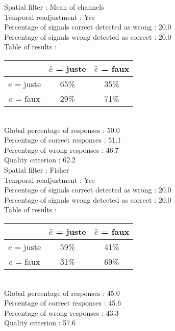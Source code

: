 Spatial filter : Mean of channels \\
Temporal readjustment : Yes \\
Percentage of signals correct detected as wrong :   20.0 \\
Percentage of signals wrong detected as correct :   20.0 \\
Table of results : \\
\begin{tabular}{|c|c|c|}
\hline				& $\hat{e}$ = juste & $\hat{e}$ = faux \\
\hline  $e$ = juste	&     65\%			&     35\%		\\
\hline  $e$ = faux	&     29\%			&     71\%		\\
\hline
\end{tabular}\\
Global percentage of responses :   50.0 \\
Percentage of correct responses :   51.1 \\
Percentage of wrong responses :   46.7 \\
Quality criterion :   62.2 \\

Spatial filter : Fisher \\
Temporal readjustment : Yes \\
Percentage of signals correct detected as wrong :   20.0 \\
Percentage of signals wrong detected as correct :   20.0 \\
Table of results : \\
\begin{tabular}{|c|c|c|}
\hline				& $\hat{e}$ = juste & $\hat{e}$ = faux \\
\hline  $e$ = juste	&     59\%			&     41\%		\\
\hline  $e$ = faux	&     31\%			&     69\%		\\
\hline
\end{tabular}\\
Global percentage of responses :   45.0 \\
Percentage of correct responses :   45.6 \\
Percentage of wrong responses :   43.3 \\
Quality criterion :   57.6 \\

